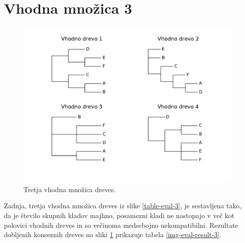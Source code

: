 \documentclass[a4paper, 12pt]{book}
\begin{document}
\section{Vhodna množica 3}
\begin{figure}[h!]
	\begin{center}
		\includegraphics[scale=0.63, clip=true, trim=0 2cm 0 0.5cm]{gfx/eval_input_3.pdf}
	\end{center}
	\caption{Tretja vhodna množica dreves.}
	\label{img-eval-input-3}
\end{figure}

Zadnja, tretja vhodna množica dreves iz slike \ref{table-eval-3}, je sestavljena tako, da je število skupnih kladov majhno, posamezni kladi ne nastopajo v več kot polovici vhodnih dreves in so večinoma medsebojno nekompatibilni. Rezultate dobljenih konseznih dreves na sliki \ref{img-eval-input-3} prikazuje tabela \ref{img-eval-result-3}.
\end{document}
